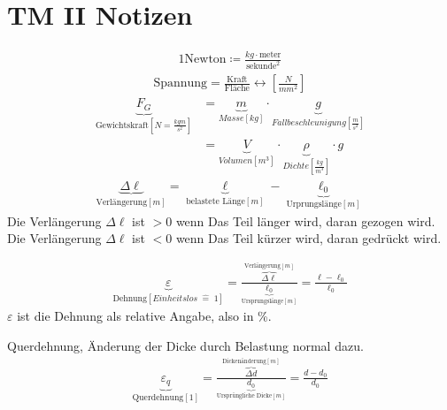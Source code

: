 \documentclass[11pt]{article}
\newcommand{\1}{ {\mathds{1}} }
\newcommand{\ueberschrift}{TM II Notizen}
\begin{document}
	\pagestyle{fancy}
\section*{\ueberschrift}	
	\begin{align*}
		1 \text{Newton} \coloneqq \frac{kg \cdot \text{meter}}{\text{sekunde}^2}
	\end{align*}
	\hrulefill
	\begin{align*}
		\text{Spannung} = \frac{\text{Kraft}}{\text{Fläche}} \leftrightarrow \left[\frac{N}{mm^2}\right]
	\end{align*}
	\hrulefill
	\begin{align*}
		\underbrace{F_G}_{\text{Gewichtskraft} [N = \frac{kg m}{s^2}]} &= \underbrace{m}_{Masse\left[kg\right]} \cdot \underbrace{g}_{Fallbeschleunigung \left[\frac{m}{s^2}\right]} \\ 
		&= \underbrace{V}_{Volumen\left[m^3\right]} \cdot \underbrace{\rho}_{Dichte\left[\frac{kg}{m^3}\right]} \cdot g
	\end{align*}
	\hrulefill
	\begin{align*}
		\underbrace{\Delta \ell}_{\text{Verlängerung}\left[m\right]} = \underbrace{\ell}_{\text{belastete Länge} \left[m\right]} - \underbrace{\ell_0}_{\text{Urprungslänge} \left[m\right]}
	\end{align*}
	Die Verlängerung $\Delta \ell$ ist $>0$ wenn Das Teil länger wird, daran gezogen wird.\\
	Die Verlängerung $\Delta \ell$ ist $<0$ wenn Das Teil kürzer wird, daran gedrückt wird.
	
	\hrulefill
	\begin{align*}
		\underbrace{\varepsilon}_{\text{Dehnung} \left[Einheitslos \; \widehat{=}\; 1\right]} 
		=
		\frac{\overbrace{\Delta \ell}^{\text{Verlängerung}\left[m\right]}}{\underbrace{\ell_0}_{\text{Ursprungslänge}\left[m\right]}}
		= \frac{\ell - \ell_0}{\ell_0}
	\end{align*}
	$\varepsilon$ ist die Dehnung als relative Angabe, also in \%.
	
	\hrulefill
	
	Querdehnung, Änderung der Dicke durch Belastung normal dazu.
	\begin{align*}
		\underbrace{\varepsilon_q}_{\text{Querdehnung} \left[1\right]} 
		=
		\frac{\overbrace{\Delta d}^{\text{Dickenänderung}\left[m\right]}}{\underbrace{d_0}_{\text{Ursprüngliche Dicke} \left[m\right]}}
		= \frac{d - d_0}{d_0}
	\end{align*}	
	\hrulefill
	
\end{document}
